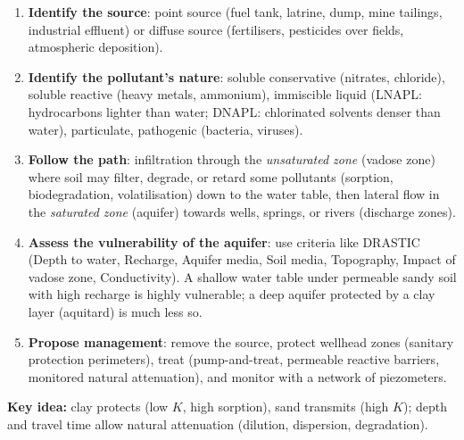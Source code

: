 \documentclass[11pt]{article}
\newcommand{\cle}[1]{{\popxbold\color{popdark}#1}}
\begin{document}
\begin{methode}
\begin{enumerate}
\item \textbf{Identify the source}: point source (fuel tank, latrine, dump, mine tailings, industrial effluent) or diffuse source (fertilisers, pesticides over fields, atmospheric deposition).
\item \textbf{Identify the pollutant's nature}: soluble conservative (nitrates, chloride), soluble reactive (heavy metals, ammonium), immiscible liquid (LNAPL: hydrocarbons lighter than water; DNAPL: chlorinated solvents denser than water), particulate, pathogenic (bacteria, viruses).
\item \textbf{Follow the path}: infiltration through the \emph{unsaturated zone} (vadose zone) where soil may filter, degrade, or retard some pollutants (sorption, biodegradation, volatilisation) down to the \cle{water table}, then lateral flow in the \emph{saturated zone} (aquifer) towards wells, springs, or rivers (discharge zones).
\item \textbf{Assess the vulnerability of the aquifer}: use criteria like DRASTIC (Depth to water, Recharge, Aquifer media, Soil media, Topography, Impact of vadose zone, Conductivity). A shallow water table under permeable sandy soil with high recharge is highly vulnerable; a deep aquifer protected by a clay layer (aquitard) is much less so.
\item \textbf{Propose management}: remove the source, protect wellhead zones (sanitary protection perimeters), treat (pump-and-treat, permeable reactive barriers, monitored natural attenuation), and monitor with a network of piezometers.
\end{enumerate}
\textbf{Key idea:} clay protects (low $K$, high sorption), sand transmits (high $K$); depth and travel time allow natural attenuation (dilution, dispersion, degradation).
\end{methode}
\end{document}
